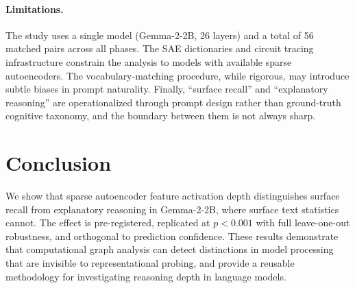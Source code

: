 \documentclass[10pt]{article}
\begin{document}
\paragraph{Limitations.}
The study uses a single model (Gemma-2-2B, 26 layers) and a total of 56 matched pairs across all phases. The SAE dictionaries and circuit tracing infrastructure constrain the analysis to models with available sparse autoencoders. The vocabulary-matching procedure, while rigorous, may introduce subtle biases in prompt naturality. Finally, ``surface recall'' and ``explanatory reasoning'' are operationalized through prompt design rather than ground-truth cognitive taxonomy, and the boundary between them is not always sharp.

\section{Conclusion}

We show that sparse autoencoder feature activation depth distinguishes surface recall from explanatory reasoning in Gemma-2-2B, where surface text statistics cannot. The effect is pre-registered, replicated at $p < 0.001$ with full leave-one-out robustness, and orthogonal to prediction confidence. These results demonstrate that computational graph analysis can detect distinctions in model processing that are invisible to representational probing, and provide a reusable methodology for investigating reasoning depth in language models.



\end{document}
